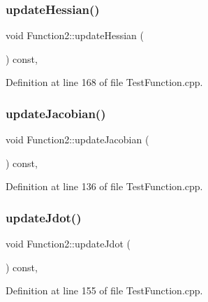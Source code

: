 \subsubsection{\texorpdfstring{update\+Hessian()}{updateHessian()}}
{\footnotesize\ttfamily void Function2\+::update\+Hessian (\begin{DoxyParamCaption}{ }\end{DoxyParamCaption}) const\hspace{0.3cm}{\ttfamily [inline]}, {\ttfamily [protected]}}



Definition at line 168 of file Test\+Function.\+cpp.

\hypertarget{classFunction2_aed704dcbe5332636a56a49d91f40d65f}{}\label{classFunction2_aed704dcbe5332636a56a49d91f40d65f} 
\subsubsection{\texorpdfstring{update\+Jacobian()}{updateJacobian()}}
{\footnotesize\ttfamily void Function2\+::update\+Jacobian (\begin{DoxyParamCaption}{ }\end{DoxyParamCaption}) const\hspace{0.3cm}{\ttfamily [inline]}, {\ttfamily [protected]}}



Definition at line 136 of file Test\+Function.\+cpp.

\hypertarget{classFunction2_a134ead37ced770c93bbce1ef656564bb}{}\label{classFunction2_a134ead37ced770c93bbce1ef656564bb} 
\subsubsection{\texorpdfstring{update\+Jdot()}{updateJdot()}}
{\footnotesize\ttfamily void Function2\+::update\+Jdot (\begin{DoxyParamCaption}{ }\end{DoxyParamCaption}) const\hspace{0.3cm}{\ttfamily [inline]}, {\ttfamily [protected]}}



Definition at line 155 of file Test\+Function.\+cpp.

\hypertarget{classFunction2_ac5152db91aedd2eddb4b69e6bd446659}{}\label{classFunction2_ac5152db91aedd2eddb4b69e6bd446659} 
